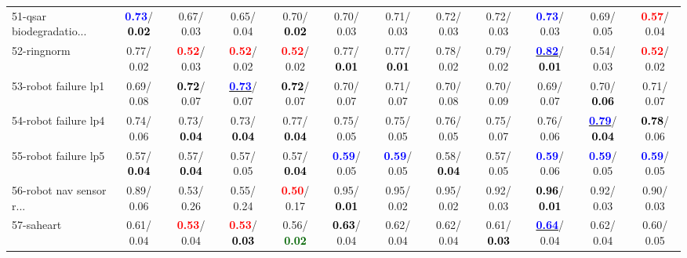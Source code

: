 \begin{table}[h]
\begin{center}
{\begin{tabular}{lc|c|c|c|c|c|c|c|c|c|c}
51-qsar biodegradatio... & \textcolor{blue}{\textbf{  0.73}}/\textcolor{black}{\textbf{  0.02}} &   0.67/  0.03 &   0.65/  0.04 &   0.70/\textcolor{black}{\textbf{  0.02}} &   0.70/  0.03 &   0.71/  0.03 &   0.72/  0.03 &   0.72/  0.03 & \textcolor{blue}{\textbf{  0.73}}/  0.03 &   0.69/  0.05 & \textcolor{red}{\textbf{  0.57}}/  0.04 \\
52-ringnorm &   0.77/  0.02 & \textcolor{red}{\textbf{  0.52}}/  0.03 & \textcolor{red}{\textbf{  0.52}}/  0.02 & \textcolor{red}{\textbf{  0.52}}/  0.02 &   0.77/\textcolor{black}{\textbf{  0.01}} &   0.77/\textcolor{black}{\textbf{  0.01}} &   0.78/  0.02 &   0.79/  0.02 & \underline{\textcolor{blue}{\textbf{  0.82}}}/\textcolor{black}{\textbf{  0.01}} &   0.54/  0.03 & \textcolor{red}{\textbf{  0.52}}/  0.02 \\
53-robot failure lp1 &   0.69/  0.08 & \textcolor{black}{\textbf{  0.72}}/  0.07 & \underline{\textcolor{blue}{\textbf{  0.73}}}/  0.07 & \textcolor{black}{\textbf{  0.72}}/  0.07 &   0.70/  0.07 &   0.71/  0.07 &   0.70/  0.08 &   0.70/  0.09 &   0.69/  0.07 &   0.70/\textcolor{black}{\textbf{  0.06}} &   0.71/  0.07 \\ \hline
54-robot failure lp4 &   0.74/  0.06 &   0.73/\textcolor{black}{\textbf{  0.04}} &   0.73/\textcolor{black}{\textbf{  0.04}} &   0.77/\textcolor{black}{\textbf{  0.04}} &   0.75/  0.05 &   0.75/  0.05 &   0.76/  0.05 &   0.75/  0.07 &   0.76/  0.06 & \underline{\textcolor{blue}{\textbf{  0.79}}}/\textcolor{black}{\textbf{  0.04}} & \textcolor{black}{\textbf{  0.78}}/  0.06 \\
55-robot failure lp5 &   0.57/\textcolor{black}{\textbf{  0.04}} &   0.57/\textcolor{black}{\textbf{  0.04}} &   0.57/  0.05 &   0.57/\textcolor{black}{\textbf{  0.04}} & \textcolor{blue}{\textbf{  0.59}}/  0.05 & \textcolor{blue}{\textbf{  0.59}}/  0.05 &   0.58/\textcolor{black}{\textbf{  0.04}} &   0.57/  0.05 & \textcolor{blue}{\textbf{  0.59}}/  0.06 & \textcolor{blue}{\textbf{  0.59}}/  0.05 & \textcolor{blue}{\textbf{  0.59}}/  0.05 \\
56-robot nav sensor r... &   0.89/  0.06 &   0.53/  0.26 &   0.55/  0.24 & \textcolor{red}{\textbf{  0.50}}/  0.17 &   0.95/\textcolor{black}{\textbf{  0.01}} &   0.95/  0.02 &   0.95/  0.02 &   0.92/  0.03 & \textcolor{black}{\textbf{  0.96}}/\textcolor{black}{\textbf{  0.01}} &   0.92/  0.03 &   0.90/  0.03 \\
57-saheart &   0.61/  0.04 & \textcolor{red}{\textbf{  0.53}}/  0.04 & \textcolor{red}{\textbf{  0.53}}/\textcolor{black}{\textbf{  0.03}} &   0.56/\textcolor{darkgreen}{\textbf{  0.02}} & \textcolor{black}{\textbf{  0.63}}/  0.04 &   0.62/  0.04 &   0.62/  0.04 &   0.61/\textcolor{black}{\textbf{  0.03}} & \underline{\textcolor{blue}{\textbf{  0.64}}}/  0.04 &   0.62/  0.04 &   0.60/  0.05 \\

\end{tabular}}
\end{center}
\end{table}
